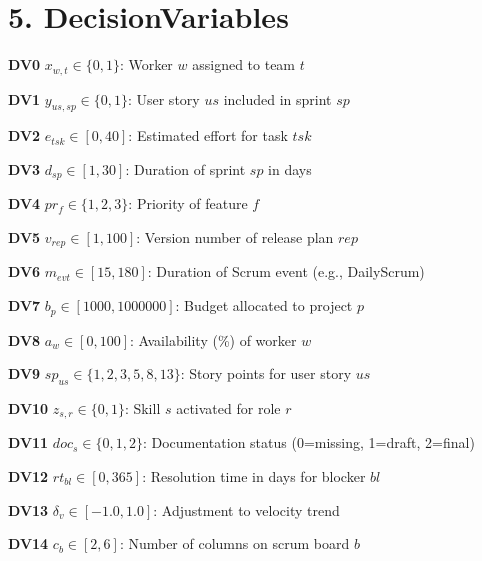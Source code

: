\documentclass[12pt]{article}
\begin{document}
\section{5. DecisionVariables}
\item[\textbf{DV0}] $ x_{w,t} \in \{0,1\} $: Worker $ w $ assigned to team $ t $
    \item[\textbf{DV1}] $ y_{us,sp} \in \{0,1\} $: User story $ us $ included in sprint $ sp $
    \item[\textbf{DV2}] $ e_{tsk} \in [0, 40] $: Estimated effort for task $ tsk $
    \item[\textbf{DV3}] $ d_{sp} \in [1, 30] $: Duration of sprint $ sp $ in days
    \item[\textbf{DV4}] $ pr_f \in \{1,2,3\} $: Priority of feature $ f $
    \item[\textbf{DV5}] $ v_{rep} \in [1, 100] $: Version number of release plan $ rep $
    \item[\textbf{DV6}] $ m_{evt} \in [15, 180] $: Duration of Scrum event (e.g., DailyScrum)
    \item[\textbf{DV7}] $ b_p \in [1000, 1000000] $: Budget allocated to project $ p $
    \item[\textbf{DV8}] $ a_w \in [0, 100] $: Availability (\%) of worker $ w $
    \item[\textbf{DV9}] $ sp_{us} \in \{1,2,3,5,8,13\} $: Story points for user story $ us $
    \item[\textbf{DV10}] $ z_{s,r} \in \{0,1\} $: Skill $ s $ activated for role $ r $
    \item[\textbf{DV11}] $ doc_s \in \{0,1,2\} $: Documentation status (0=missing, 1=draft, 2=final)
    \item[\textbf{DV12}] $ rt_{bl} \in [0, 365] $: Resolution time in days for blocker $ bl $
    \item[\textbf{DV13}] $ \delta_v \in [-1.0, 1.0] $: Adjustment to velocity trend
    \item[\textbf{DV14}] $ c_b \in [2,6] $: Number of columns on scrum board $ b $
\end{document}
